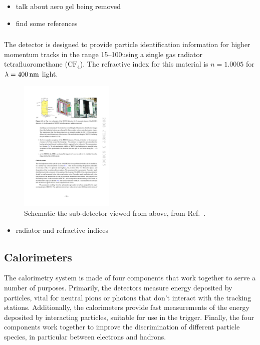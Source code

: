{\color{Red}
\begin{itemize}
\item talk about aero gel being removed
\item find some references 
\end{itemize}
}

\subsubsection{\richtwo}

The \richtwo detector is designed to provide particle identification information for higher momentum tracks in the range 15--100\gevc using a single gas radiator tetrafluoromethane ($\text{C}\text{F}_{4}$). The refractive index for this material is $n=1.0005$ for $\lambda = 400\mathrm{ \,nm}$ light.

\begin{figure}[!h]
    \centering        
    \includegraphics[width=0.4\textwidth]{figs/Detector/richtwo_layout.pdf}
    \caption{Schematic the \richtwo sub-detector viewed from above, from Ref.~\cite{Alves:2008zz}.}
    \label{fig:Dec_richtwo_layout}   
\end{figure}

{\color{Red}
\begin{itemize}
\item radiator and refractive indices 
\end{itemize}
}

\subsection{Calorimeters}

The calorimetry system is made of four components that work together to serve a number of purposes. 
Primarily, the detectors measure energy deposited by particles, vital for neutral pions or photons that don't interact with the tracking stations. Additionally, the calorimeters provide fast measurements of the energy deposited by interacting particles, suitable for use in the trigger. Finally, the four components work together to improve the discrimination of different particle species, in particular between electrons and hadrons. 



